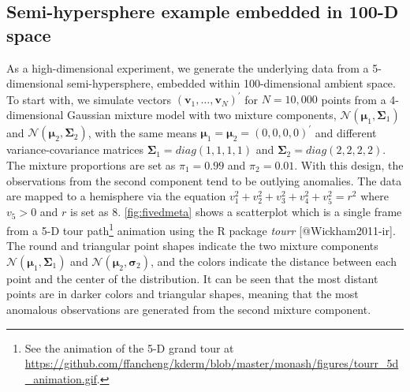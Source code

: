 \documentclass[
]{article}
\begin{document}
\hypertarget{fivedgaussian}{%
\subsection{Semi-hypersphere example embedded in 100-D
space}\label{fivedgaussian}}

As a high-dimensional experiment, we generate the underlying data from a
5-dimensional semi-hypersphere, embedded within 100-dimensional ambient
space. To start with, we simulate vectors
\((\bm{v}_1, \dots, \bm{v}_N)^\prime\) for \(N=10,000\) points from a
4-dimensional Gaussian mixture model with two mixture components,
\(\mathcal{N}(\bm{\mu}_1, \bm{\Sigma}_1)\) and
\(\mathcal{N}(\bm{\mu}_2, \bm{\Sigma}_2)\), with the same means
\(\bm{\mu}_1 = \bm{\mu}_2 =(0, 0, 0, 0)^\prime\) and different
variance-covariance matrices \(\bm{\Sigma}_1 = diag(1,1,1,1)\) and
\(\bm{\Sigma}_2 = diag(2,2,2,2)\). The mixture proportions are set as
\(\pi_1=0.99\) and \(\pi_2=0.01\). With this design, the observations
from the second component tend to be outlying anomalies. The data are
mapped to a hemisphere via the equation
\(v_1^2 + v_2^2 + v_3^2 + v_4^2 + v_5^2 = r^2\) where \(v_5>0\) and
\(r\) is set as \(8\). \autoref{fig:fivedmeta} shows a scatterplot which
is a single frame from a 5-D tour path\footnote{See the animation of the
  5-D grand tour at
  \url{https://github.com/ffancheng/kderm/blob/master/monash/figures/tourr_5d_animation.gif}.}
animation using the R package \emph{tourr} {[}@Wickham2011-ir{]}. The
round and triangular point shapes indicate the two mixture components
\(\mathcal{N}(\bm{\mu}_1, \bm{\Sigma}_1)\) and
\(\mathcal{N}(\bm{\mu}_2, \bm{\sigma}_2)\), and the colors indicate the
distance between each point and the center of the distribution. It can
be seen that the most distant points are in darker colors and triangular
shapes, meaning that the most anomalous observations are generated from
the second mixture component.
\end{document}
